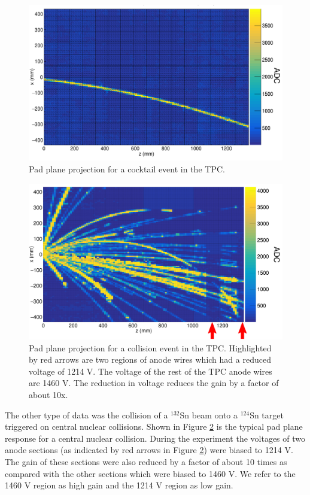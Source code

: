 \documentclass[review]{elsarticle}
\begin{document}
\begin{figure}[ht!]
\includegraphics[width=\linewidth]{cocktail.png}
\caption{Pad plane projection for a cocktail event in the TPC.}
\label{fig:cocktail}
\end{figure}

\begin{figure}[ht!]
\includegraphics[width=\linewidth]{data.pdf}
\caption{Pad plane projection for a collision event in the TPC. Highlighted by red arrows are two regions of anode wires which had a reduced voltage of 1214 V. The voltage of the rest of the TPC anode wires are 1460 V. The reduction in voltage reduces the gain by a factor of about 10x. }
\label{fig:data}
\end{figure}



The other type of data was the collision of a ${}^{132}$Sn beam onto a ${}^{124}$Sn target triggered on central nuclear collisions. Shown in Figure \ref{fig:data} is the typical pad plane response for a central nuclear collision. During the experiment the voltages of two anode sections (as indicated by red arrows in Figure \ref{fig:data}) were biased to 1214 V. The gain of these sections were also reduced by a factor of about 10 times as compared with the other sections which were biased to 1460 V. We refer to the 1460 V region as high gain and the 1214 V region as low gain. 
\end{document}
